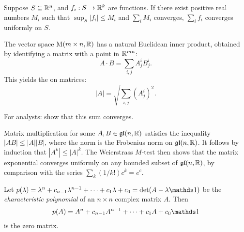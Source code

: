 \documentclass[10pt]{article}
\begin{document}
\begin{definition}
	 Suppose $S \subseteq \mathbb{R}^n$, and $f_i:S\to\mathbb{R}^k$ are functions. If there exist positive real numbers $M_i$ such that $\sup_S|f_i|\le M_i$ and $\sum_{i} M_i$ converges, $\sum_{i} f_i$ converges uniformly on $S$.
\end{definition}
 

\begin{definition}
	The vector space M$(m\times n,\mathbb{R})$ has a natural Euclidean inner product, obtained by identifying a matrix with a point in $\mathbb{R}^{mn}$:
	$$
	A\cdot B = \sum_{i,j} A_j^iB_j^i.
	$$
	This yields the  on matrices:
	$$
	|A| = \sqrt{\sum_{i,j} (A_j^i)^2}.
	$$
\end{definition}


\begin{example}
	For analysts: show that this sum converges.
\end{example}
\sol Matrix multiplication  for some $A,B \in \mathfrak{gl}(n,\mathbb{R})$ satisfies the inequality $|AB| \le |A||B|$, where the norm is the Frobenius norm on $\mathfrak{gl}(n,\mathbb{R})$. It follows by induction that $|A^k| \le |A|^k$. The Weierstrass $M$-test then shows that the matrix exponential converges uniformly on any bounded subset of $\mathfrak{gl}(n,\mathbb{R})$, by comparison with the series $\sum_k(1/k!)c^k=e^c$.


\begin{definition}
	 Let $p(\lambda) = \lambda^n + c_{n-1} \lambda^{n-1} + \cdots + c_1 \lambda + c_0 = \det(A - \lambda\id)$ be the \emph{characteristic polynomial} of an $n\times n$ complex matrix $A$. Then
	$$p(A) = A^n + c_{n-1} A^{n-1} + \cdots + c_1 A + c_0\id$$ is the zero matrix.
\end{definition}
\end{document}
